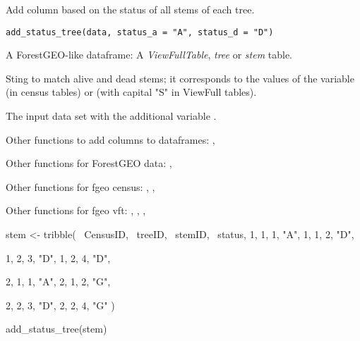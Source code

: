 \documentclass[a4paper]{book}
\begin{document}
%
\begin{Description}\relax
Add column  based on the status of all stems of each tree.
\end{Description}
%
\begin{Usage}
\begin{verbatim}
add_status_tree(data, status_a = "A", status_d = "D")
\end{verbatim}
\end{Usage}
%
\begin{Arguments}
\begin{ldescription}
\item[\code{data}] A ForestGEO-like dataframe: A \emph{ViewFullTable}, \emph{tree} or \emph{stem}
table.

\item[\code{status\_a, status\_d}] Sting to match alive and dead stems; it corresponds
to the values of the variable  (in census tables) or  (with
capital "S" in ViewFull tables).
\end{ldescription}
\end{Arguments}
%
\begin{Value}
The input data set with the additional variable .
\end{Value}
%
\begin{SeeAlso}\relax
Other functions to add columns to dataframes: ,

Other functions for ForestGEO data: ,

Other functions for fgeo census: ,
, 

Other functions for fgeo vft: ,
, ,
\end{SeeAlso}
%
\begin{Examples}
\begin{ExampleCode}
stem <- tribble(
  ~CensusID, ~treeID, ~stemID, ~status,
          1,       1,       1,     "A",
          1,       1,       2,     "D",
          
          1,       2,       3,     "D",
          1,       2,       4,     "D",
          
          
          
          2,       1,       1,     "A",
          2,       1,       2,     "G",
          
          2,       2,       3,     "D",
          2,       2,       4,     "G"
)

add_status_tree(stem)

\end{ExampleCode}
\end{Examples}
\end{document}

